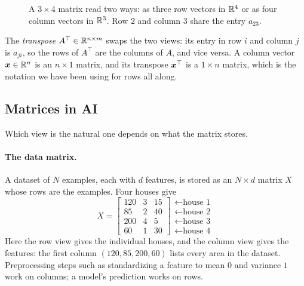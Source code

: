 \begin{figure}[ht]
  \centering
  \caption{A $3 \times 4$ matrix read two ways: as three row vectors in
    $\mathbb{R}^4$ or as four column vectors in $\mathbb{R}^3$. Row $2$ and column $3$
    share the entry $a_{23}$.}
  \label{fig:ch03-rows-cols}
\end{figure}

The \emph{transpose} $A^\top \in \mathbb{R}^{n \times m}$ swaps the two views: its
entry in row $i$ and column $j$ is $a_{ji}$, so the rows of $A^\top$ are
the columns of $A$, and vice versa. A column vector $\bm{x} \in \mathbb{R}^n$ is
an $n \times 1$ matrix, and its transpose $\bm{x}^\top$ is a
$1 \times n$ matrix, which is the notation we have been using for rows
all along.

\subsection{Matrices in AI}
\label{sec:ch03-matrices-ai}

Which view is the natural one depends on what the matrix stores.

\paragraph{The data matrix.}
A dataset of $N$ examples, each with $d$ features, is stored as an
$N \times d$ matrix $X$ whose rows are the examples. Four houses give
\[
  X =
  \begin{bmatrix}
    120 & 3 & 15 \\
    85 & 2 & 40 \\
    200 & 4 & 5 \\
    60 & 1 & 30
  \end{bmatrix}
  \begin{matrix}
    \leftarrow \text{house 1} \\
    \leftarrow \text{house 2} \\
    \leftarrow \text{house 3} \\
    \leftarrow \text{house 4}
  \end{matrix}
\]
Here the row view gives the individual houses, and the column view gives
the features: the first column $(120, 85, 200, 60)$ lists every area in
the dataset. Preprocessing steps such as standardizing a feature to mean
$0$ and variance $1$ work on columns; a model's prediction works on rows.

